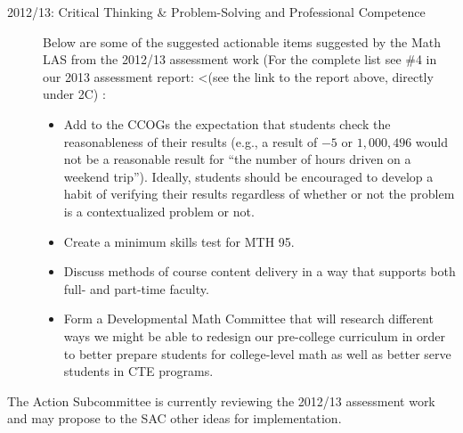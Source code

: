 \begin{description}
\item[2012/13:  Critical Thinking \& Problem-Solving and Professional Competence]

Below are some of the suggested actionable items suggested by the Math LAS from the 2012/13 assessment work  (For the complete list see \#4 in our 2013 assessment report: <(see the link to the report above, directly under 2C) : 
\begin{itemize}
\item Add to the CCOGs the expectation that students check the reasonableness of their results (e.g., a result of $-5$ or $1{,}000{,}496$ would not be a reasonable result for ``the number of hours driven on a weekend trip'').  Ideally, students should be encouraged to develop a habit of verifying their results regardless of whether or not the problem is a contextualized problem or not.
\item Create a minimum skills test for MTH 95.
\item Discuss methods of course content delivery in a way that supports both full- and part-time faculty.
\item Form a Developmental Math Committee that will research different ways we might be able to redesign our pre-college curriculum in order to better prepare students for college-level math as well as better serve students in CTE programs.
\end{itemize}

\end{description}

The Action Subcommittee is currently reviewing the 2012/13 assessment work and may propose to the SAC other ideas for implementation.


